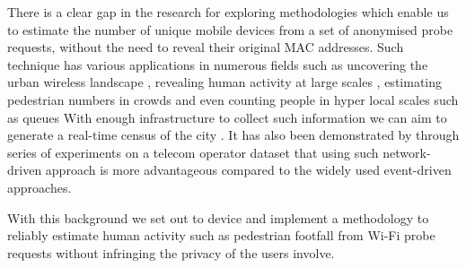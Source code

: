 There is a clear gap in the research for exploring methodologies which enable us to estimate the number of unique mobile devices from a set of anonymised probe requests, without the need to reveal their original MAC addresses.
Such technique has various applications in numerous fields such as uncovering the urban wireless landscape \citep{rose2010mapping}, revealing human activity at large scales \citep{qin2013discovering}, estimating pedestrian numbers in crowds \citep{schauer2014estimating,fukuzaki2015statistical} and even counting people in hyper local scales such as queues \citep{wang2013measuring}
With enough infrastructure to collect such information we can aim to generate a real-time census of the city \citep{konto2017}.
It has also been demonstrated by \citep{pinelli2015comparing} through series of experiments on a telecom operator dataset that using such network-driven approach is more advantageous compared to the widely used event-driven approaches.

With this background we set out to device and implement a methodology to reliably estimate human activity such as pedestrian footfall from Wi-Fi probe requests without infringing the privacy of the users involve.
